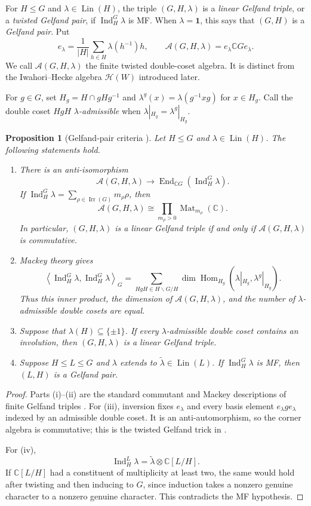 \documentclass[11pt]{article}
\numberwithin{equation}{section}
\newtheorem{proposition}[theorem]{Proposition}
\theoremstyle{definition}
\DeclareMathOperator{\Ind}{Ind}
\DeclareMathOperator{\Irr}{Irr}
\DeclareMathOperator{\Lin}{Lin}
\DeclareMathOperator{\Hom}{Hom}
\newcommand{\C}{\mathbb C}
\newcommand{\HH}{\mathcal H}
\newcommand{\one}{\mathbf 1}
\begin{document}
For \(H\leq G\) and \(\lambda\in\Lin(H)\), the triple
\((G,H,\lambda)\) is a \emph{linear Gelfand triple}, or a
\emph{twisted Gelfand pair}, if \(\Ind_H^G\lambda\) is MF.
When \(\lambda=\one\), this says that \((G,H)\) is a
\emph{Gelfand pair}.
Put
\[
 e_\lambda=\frac1{|H|}\sum_{h\in H}\lambda(h^{-1})h,
 \qquad
 \mathscr A(G,H,\lambda)=e_\lambda\C G e_\lambda .
\]
We call \(\mathscr A(G,H,\lambda)\) the finite twisted double-coset
algebra.  It is distinct from the Iwahori--Hecke algebra \(\HH(W)\)
introduced later.

For \(g\in G\), set \(H_g=H\cap gHg^{-1}\) and
\(\lambda^g(x)=\lambda(g^{-1}xg)\) for \(x\in H_g\).
Call the double coset \(HgH\) \emph{\(\lambda\)-admissible} when
\(\lambda|_{H_g}=\lambda^g|_{H_g}\).

\begin{proposition}[Gelfand-pair criteria \cite{CSST,RSW}]
\label{prop:Gelfandcriteria}
Let \(H\leq G\) and \(\lambda\in\Lin(H)\).
The following statements hold.
\begin{enumerate}[label=(\roman*)]
\item There is an anti-isomorphism
\[
 \mathscr A(G,H,\lambda)
 \longrightarrow
 \operatorname{End}_{\C G}(\Ind_H^G\lambda).
\]
If
\(\Ind_H^G\lambda=\sum_{\rho\in\Irr(G)}m_\rho\rho\), then
\[
 \mathscr A(G,H,\lambda)
 \cong\prod_{m_\rho>0}\operatorname{Mat}_{m_\rho}(\C).
\]
In particular, \((G,H,\lambda)\) is a linear Gelfand triple if and
only if \(\mathscr A(G,H,\lambda)\) is commutative.
\item Mackey theory gives
\begin{equation}
 \left\langle\Ind_H^G\lambda,\Ind_H^G\lambda\right\rangle_G
 =\sum_{HgH\in H\backslash G/H}
   \dim\Hom_{H_g}(\lambda|_{H_g},\lambda^g|_{H_g}).
 \label{eq:MackeyGelfand}
\end{equation}
Thus this inner product, the dimension of \(\mathscr A(G,H,\lambda)\),
and the number of \(\lambda\)-admissible double cosets are equal.
\item Suppose that \(\lambda(H)\subseteq\{\pm1\}\).  If every
\(\lambda\)-admissible double coset contains an involution, then
\((G,H,\lambda)\) is a linear Gelfand triple.
\item Suppose \(H\leq L\leq G\) and \(\lambda\) extends to
\(\widetilde\lambda\in\Lin(L)\).  If
\(\Ind_H^G\lambda\) is MF, then \((L,H)\) is a Gelfand pair.
\end{enumerate}
\end{proposition}
\begin{proof}
Parts (i)--(ii) are the standard commutant and Mackey descriptions of
finite Gelfand triples \cite{CSST}.
For (iii), inversion fixes \(e_\lambda\) and every basis element
\(e_\lambda g e_\lambda\) indexed by an admissible double coset.
It is an anti-automorphism, so the corner algebra is commutative; this
is the twisted Gelfand trick in \cite[Proposition III.1.2]{RSW}.

For (iv),
\[
 \Ind_H^L\lambda
 =\widetilde\lambda\otimes\C[L/H].
\]
If \(\C[L/H]\) had a constituent of multiplicity at least two, the
same would hold after twisting and then inducing to \(G\), since
induction takes a nonzero genuine character to a nonzero genuine
character.  This contradicts the MF hypothesis.
\end{proof}
\end{document}
